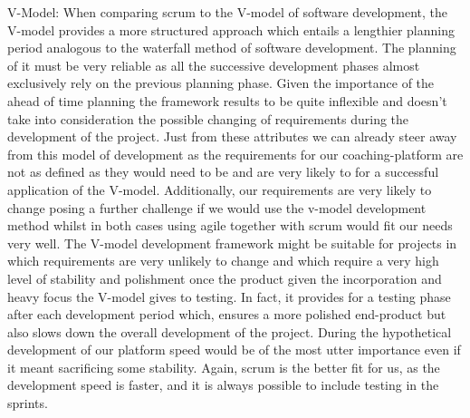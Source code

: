 \documentclass[12pt]{report}
\begin{document}
V-Model: 
When comparing scrum to the V-model of software development, the V-model provides a more structured approach which entails a lengthier planning period analogous to the waterfall method of software development. The planning of it must be very reliable as all the successive development phases almost exclusively rely on the previous planning phase. Given the importance of the ahead of time planning the framework results to be quite inflexible and doesn’t take into consideration the possible changing of requirements during the development of the project.  Just from these attributes we can already steer away from this model of development as the requirements for our coaching-platform are not as defined as they would need to be and are very likely to for a successful application of the V-model. Additionally, our requirements are very likely to change posing a further challenge if we would use the v-model development method whilst in both cases using agile together with scrum would fit our needs very well.
The V-model development framework might be suitable for projects in which requirements are very unlikely to change and which require a very high level of stability and polishment once the product given the incorporation and heavy focus the V-model gives to testing. In fact, it provides for a testing phase after each development period which, ensures a more polished end-product but also slows down the overall development of the project. During the hypothetical development of our platform speed would be of the most utter importance even if it meant sacrificing some stability. Again, scrum is the better fit for us, as the development speed is faster, and it is always possible to include testing in the sprints. 
\end{document}
